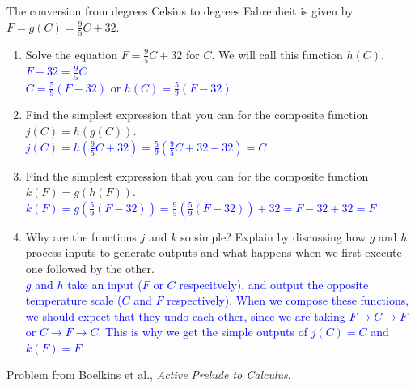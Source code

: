 \documentclass{ximera}
\begin{document}
\begin{exercise}
    The conversion from degrees Celsius to degrees Fahrenheit is given by $F=g(C)=\frac95 C+32$.
    \begin{enumerate}
        \item Solve the equation $F=\frac95C+32$ for $C$.  We will call this function $h(C)$.\\
        \textcolor{blue}{$F-32=\frac95 C$\\
        $C=\frac59(F-32)$ or $h(C)=\frac59(F-32)$}
        \item Find the simplest expression that you can for the composite function $j(C)=h(g(C))$.\\
        \textcolor{blue}{$j(C)=h(\frac95 C+32)=\frac59(\frac95 C+32-32)=C$}
        \item Find the simplest expression that you can for the composite function $k(F)=g(h(F))$.\\
        \textcolor{blue}{$k(F)=g(\frac59(F-32))=\frac95(\frac59(F-32))+32=F-32+32=F$}
        \item Why are the functions $j$ and $k$ so simple?  Explain by discussing how $g$ and $h$ process inputs to generate outputs and what happens when we first execute one followed by the other.\\
        \textcolor{blue}{$g$ and $h$ take an input ($F$ or $C$ respecitvely), and output the opposite temperature scale ($C$ and $F$ respectively).  When we compose these functions, we should expect that they undo each other, since we are taking $F\rightarrow C \rightarrow F$ or $C\rightarrow F \rightarrow C$.  This is why we get the simple outputs of $j(C)=C$ and $k(F)=F$.}\\
    \end{enumerate}
    Problem from Boelkins et al., \textit{Active Prelude to Calculus}.
\end{exercise}
\end{document}
